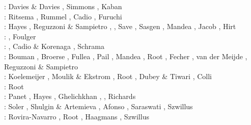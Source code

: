 \begin{scriptsize}
\twothousandten: Davies \& Davies \cite{dada10}, Simmons \etal \cite{sifb10}, 
                 Kaban \etal \cite{katc10}\\
\twothousandeleven: Ritsema \etal \cite{ridv11}, Rummel \etal \cite{ruys11}, 
                    Cadio \etal \cite{capd11}, Furuchi \cite{furu11}\\
\twothousandtwelve: Hayes \etal \cite{hawj12}, Reguzzoni \& Sampietro \cite{resa12},
                    \cite{fesw12}\cite{simj12}\cite{beck12}\cite{pahk12}, 
                    Save \etal \cite{sabt12}, Sasgen \etal \cite{sakm12}, 
                    Mandea \etal \cite{mapl12}, Jacob \etal \cite{jawp12},
                    Hirt \etal \cite{hick12}\\
\twothousandthirteen: \cite{ress13}\cite{ebbf13}\cite{davi13}\cite{scle13}\cite{waja13}, 
                      Foulger \etal \cite{fopa13}\\
\twothousandfourteen: \cite{paml14}\cite{ebbf14}\cite{krbk14}\cite{licl14}\cite{aubb14}, 
                      Cadio \& Korenaga \cite{cako14}, Schrama \etal \cite{scwr14}\\
\twothousandfifteen: Bouman \etal \cite{boem15}, Broerse \etal \cite{brrs15}, 
                     Fullea \etal \cite{furc15}, Pail \etal \cite{pabb15},
                     Mandea \etal \cite{manp15}, Root \etal \cite{rotv15},
                     Fecher \etal \cite{fepg15}, van der Meijde \etal \cite{vapb15},
                     Reguzzoni \& Sampietro \cite{resa15}\\
\twothousandsixteen: Koelemeijer \etal \cite{kord16}, Moulik \& Ekstrom \cite{moek16}, 
                     Root \etal \cite{rond16}, 
                     Dubey \& Tiwari \cite{duti16}, Colli \etal \cite{cogb16}\\
\twothousandseventeen: Root \etal \cite{roev17}\\
\twothousandeighteen: Panet \etal \cite{pabn18}, Hayes \etal \cite{hamp18}, 
                      Ghelichkhan \etal \cite{ghmc18}, \cite{homs18}, 
                      Richards \etal \cite{rihc18}\\
\twothousandnineteen: Soler \etal \cite{sopg19}, Shulgin \& Artemieva \cite{shar19}, 
                      Afonso \etal \cite{afss19}, 
                      Saraswati \cite{sacm19}, Szwillus \etal \cite{szae19}\\
\twothousandtwenty: Rovira-Navarro \etal \cite{rovb20}, Root \cite{root20}, 
                    Haagmans \etal \cite{hasm20}, Szwillus \etal \cite{szes20}
\end{scriptsize}

